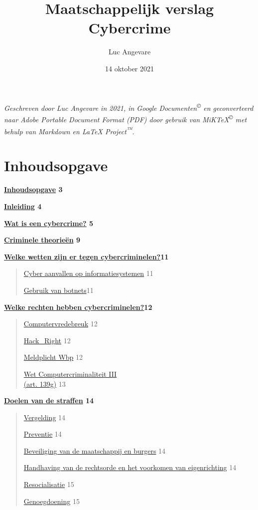 \documentclass[
]{article}
\title{\protect\hypertarget{_w38wfnrns6ar}{}{}Maatschappelijk verslag
Cybercrime}
\author{Luc Angevare}
\date{14 oktober 2021}
\begin{document}
\renewcommand{\bibname}{Referenties}
\maketitle
\pagebreak
\emph{Geschreven door Luc Angevare in 2021, in Google
Documenten\textsuperscript{©} en geconverteerd naar Adobe Portable
Document Format (PDF) door gebruik van MiKTeX\textsuperscript{©} met
behulp van Markdown en LaTeX Project\textsuperscript{™}.}
\pagebreak
\hypertarget{inhoudsopgave}{%
\section{Inhoudsopgave}\label{inhoudsopgave}}

\textbf{\protect\hyperlink{inhoudsopgave}{Inhoudsopgave} 3}

\textbf{\protect\hyperlink{inleiding}{Inleiding} 4}

\textbf{\protect\hyperlink{wat-is-een-cybercrime}{Wat is een
cybercrime?} 5}

\textbf{\protect\hyperlink{criminele-theorieuxebn}{Criminele theorieën}
9}

\textbf{\protect\hyperlink{welke-wetten-zijn-er-tegen-cybercriminelen}{Welke
wetten zijn er tegen cybercriminelen?}11}

\begin{quote}
\protect\hyperlink{cyber-aanvallen-op-informatiesystemen}{Cyber
aanvallen op informatiesystemen} 11

\protect\hyperlink{gebruik-van-botnets}{Gebruik van botnets}11
\end{quote}

\textbf{\protect\hyperlink{welke-rechten-hebben-cybercriminelen}{Welke
rechten hebben cybercriminelen?}12}

\begin{quote}
\protect\hyperlink{computervredebreuk}{Computervredebreuk} 12

\protect\hyperlink{hack_right}{Hack\_Right} 12

\protect\hyperlink{meldplicht-wbp}{Meldplicht Wbp} 12

\protect\hyperlink{wet-computercriminaliteit-iii-art.-139g}{Wet
Computercriminaliteit III\\
(art. 139g)} 13
\end{quote}

\textbf{\protect\hyperlink{doelen-van-de-straffen}{Doelen van de
straffen} 14}

\begin{quote}
\protect\hyperlink{vergelding}{Vergelding} 14

\protect\hyperlink{preventie}{Preventie} 14

\protect\hyperlink{beveiliging-van-de-maatschappij-en-burgers}{Beveiliging
van de maatschappij en burgers} 14

\protect\hyperlink{handhaving-van-de-rechtsorde-en-het-voorkomen-van-eigenrichting}{Handhaving
van de rechtsorde en het voorkomen van eigenrichting} 14

\protect\hyperlink{resocialisatie}{Resocialisatie} 15

\protect\hyperlink{genoegdoening}{Genoegdoening} 15
\end{quote}
\end{document}
